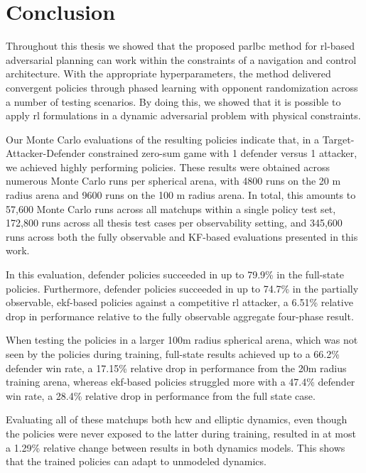 \chapter{Conclusion}

Throughout this thesis we showed that the proposed \acs{parlbc} method for \acs{rl}-based adversarial planning can work within the constraints of a navigation and control architecture. With the appropriate hyperparameters, the method delivered convergent policies through phased learning with opponent randomization across a number of testing scenarios. By doing this, we showed that it is possible to apply \acs{rl} formulations in a dynamic adversarial problem with physical constraints. 

Our Monte Carlo evaluations of the resulting policies indicate that, in a Target-Attacker-Defender constrained zero-sum game with 1 defender versus 1 attacker, we achieved highly performing policies. These results were obtained across numerous Monte Carlo runs per spherical arena, with 4800 runs on the 20 m radius arena and 9600 runs on the 100 m radius arena. In total, this amounts to 57,600 Monte Carlo runs across all matchups within a single policy test set, 172,800 runs across all thesis test cases per observability setting, and 345,600 runs across both the fully observable and KF-based evaluations presented in this work.

In this evaluation, defender policies succeeded in up to 79.9\% in the full-state policies. Furthermore, defender policies succeeded in up to 74.7\% in the partially observable, \acs{ekf}-based policies against a competitive \acs{rl} attacker, a 6.51\% relative drop in performance relative to the fully observable aggregate four-phase result.

When testing the policies in a larger 100m radius spherical arena, which was not seen by the policies during training, full-state results achieved up to a 66.2\% defender win rate, a 17.15\% relative drop in performance from the 20m radius training arena, whereas \acs{ekf}-based policies struggled more with a 47.4\% defender win rate, a 28.4\% relative drop in performance from the full state case. 

Evaluating all of these matchups both \acs{hcw} and elliptic dynamics, even though the policies were never exposed to the latter during training, resulted in at most a 1.29\% relative change between results in both dynamics models. This shows that the trained policies can adapt to unmodeled dynamics.

